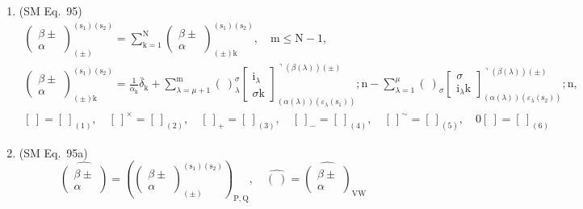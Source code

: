 \documentclass[12pt]{article}
\begin{document}
\begin{enumerate}[label=(\arabic*), series=formellist]
    \item (SM Eq.\ 95) 
    \[
    \begin{gathered}
    \left( \begin{smallmatrix} \beta \pm \\ \alpha \end{smallmatrix} \right)^{(\mathrm{s_1})(\mathrm{s_2})}_{(\pm)} = \sum_{\mathrm{k}=1}^\mathrm{N} \left( \begin{smallmatrix} \beta \pm \\ \alpha \end{smallmatrix} \right)^{(\mathrm{s_1})(\mathrm{s_2})}_{(\pm)\mathrm{k}}, \quad \mathrm{m} \le \mathrm{N}-1, \\
    \left( \begin{smallmatrix} \beta \pm \\ \alpha \end{smallmatrix} \right)^{(\mathrm{s_1})(\mathrm{s_2})}_{(\pm)\mathrm{k}} = \frac{1}{\alpha_\mathrm{k}} \bar{\delta}_\mathrm{k} + \sum_{\lambda=\mu+1}^\mathrm{m} (\ )^{\sigma}_\lambda \left[ \begin{smallmatrix} \mathrm{i}_\lambda \\ \sigma \mathrm{k} \end{smallmatrix} \right]^{\urcorner(\beta(\lambda))(\pm)}_{(\alpha(\lambda))(\varepsilon_\lambda(\mathrm{s_1}))} ; \mathrm{n} - \sum_{\lambda=1}^\mu (\ )_\sigma \left[ \begin{smallmatrix} \sigma \\ \mathrm{i}_\lambda \mathrm{k} \end{smallmatrix} \right]^{\urcorner(\beta(\lambda))(\pm)}_{(\alpha(\lambda))(\varepsilon_\lambda(\mathrm{s_2}))} ; \mathrm{n}, \\
    [ \ ] = [ \ ]_{(1)}, \quad [ \ ]^\times = [ \ ]_{(2)}, \quad [ \ ]_+ = [ \ ]_{(3)}, \quad [ \ ]_- = [ \ ]_{(4)}, \quad [ \ ]^\sim = [ \ ]_{(5)}, \quad 0[ \ ] = [ \ ]_{(6)}
    \end{gathered}
    \]

    \item (SM Eq.\ 95a) 
    \[
    \widehat{\left( \begin{smallmatrix} \beta \pm \\ \alpha \end{smallmatrix} \right)} = \left( \left( \begin{smallmatrix} \beta \pm \\ \alpha \end{smallmatrix} \right)^{(\mathrm{s}_1)(\mathrm{s}_2)}_{(\pm)} \right)_{\mathrm{P,Q}}, \quad \widehat{(\ )} = \widehat{\left( \begin{smallmatrix} \beta \pm \\ \alpha \end{smallmatrix} \right)}_{\mathrm{VW}}
    \]


\end{enumerate}
\end{document}
